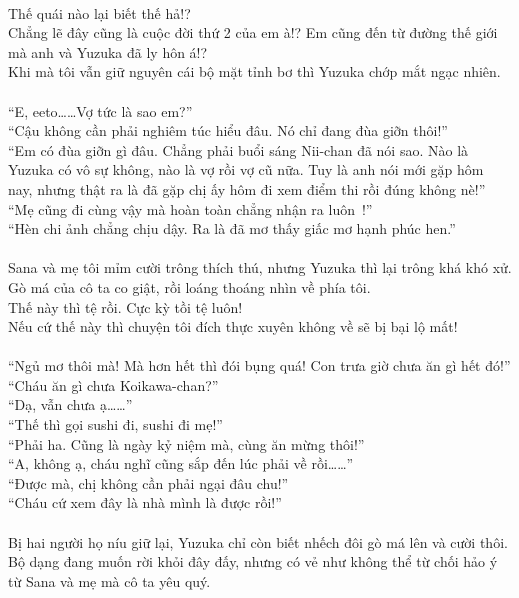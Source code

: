 \documentclass[12pt,a4paper, twosides]{book}
\begin{document}
\\
Thế quái nào lại biết thế hả!?\\
Chẳng lẽ đây cũng là cuộc đời thứ 2 của em à!? Em cũng đến từ đường thế giới mà anh và Yuzuka đã ly hôn á!?\\
Khi mà tôi vẫn giữ nguyên cái bộ mặt tỉnh bơ thì Yuzuka chớp mắt ngạc nhiên.\\
\\
“E, eeto……Vợ tức là sao em?”\\
“Cậu không cần phải nghiêm túc hiểu đâu. Nó chỉ đang đùa giỡn thôi!”\\
“Em có đùa giỡn gì đâu. Chẳng phải buổi sáng Nii-chan đã nói sao. Nào là Yuzuka có vô sự không, nào là vợ rồi vợ cũ nữa. Tuy là anh nói mới gặp hôm nay, nhưng thật ra là đã gặp chị ấy hôm đi xem điểm thi rồi đúng không nè!”\\
“Mẹ cũng đi cùng vậy mà hoàn toàn chẳng nhận ra luôn~!”\\
“Hèn chi ảnh chẳng chịu dậy. Ra là đã mơ thấy giấc mơ hạnh phúc hen.”\\
\\
Sana và mẹ tôi mỉm cười trông thích thú, nhưng Yuzuka thì lại trông khá khó xử. Gò má của cô ta co giật, rồi loáng thoáng nhìn về phía tôi.\\
Thế này thì tệ rồi. Cực kỳ tồi tệ luôn!\\
Nếu cứ thế này thì chuyện tôi đích thực xuyên không về sẽ bị bại lộ mất!\\
\\
“Ngủ mơ thôi mà! Mà hơn hết thì đói bụng quá! Con trưa giờ chưa ăn gì hết đó!”\\
“Cháu ăn gì chưa Koikawa-chan?”\\
“Dạ, vẫn chưa ạ……”\\
“Thế thì gọi sushi đi, sushi đi mẹ!”\\
“Phải ha. Cũng là ngày kỷ niệm mà, cùng ăn mừng thôi!”\\
“A, không ạ, cháu nghĩ cũng sắp đến lúc phải về rồi……”\\
“Được mà, chị không cần phải ngại đâu chu!”\\
“Cháu cứ xem đây là nhà mình là được rồi!”\\
\\
Bị hai người họ níu giữ lại, Yuzuka chỉ còn biết nhếch đôi gò má lên và cười thôi.\\
Bộ dạng đang muốn rời khỏi đây đấy, nhưng có vẻ như không thể từ chối hảo ý từ Sana và mẹ mà cô ta yêu quý.\\
\\
\end{document}
